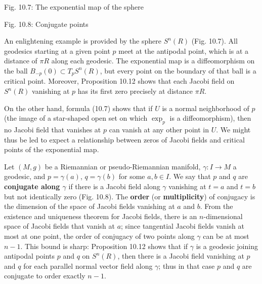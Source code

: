 
Fig. 10.7: The exponential map of the sphere


Fig. 10.8: Conjugate points

An enlightening example is provided by the sphere $S^n(R)$ (Fig. 10.7). All geodesics starting at a given point $p$ meet at the antipodal point, which is at a distance of $\pi R$ along each geodesic. The exponential map is a diffeomorphism on the ball $B_{-p}(0) \subset T_p S^n(R)$, but every point on the boundary of that ball is a critical point. Moreover, Proposition 10.12 shows that each Jacobi field on $S^n(R)$ vanishing at $p$ has its first zero precisely at distance $\pi R$.

On the other hand, formula (10.7) shows that if $U$ is a normal neighborhood of $p$ (the image of a star-shaped open set on which $\exp_p$ is a diffeomorphism), then no Jacobi field that vanishes at $p$ can vanish at any other point in $U$. We might thus be led to expect a relationship between zeros of Jacobi fields and critical points of the exponential map.

Let $(M, g)$ be a Riemannian or pseudo-Riemannian manifold, $\gamma: I \to M$ a geodesic, and $p = \gamma(a)$, $q = \gamma(b)$ for some $a, b \in I$. We say that $p$ and $q$ are \textbf{conjugate along $\gamma$} if there is a Jacobi field along $\gamma$ vanishing at $t = a$ and $t = b$ but not identically zero (Fig. 10.8). The \textbf{order} (or \textbf{multiplicity}) of conjugacy is the dimension of the space of Jacobi fields vanishing at $a$ and $b$. From the existence and uniqueness theorem for Jacobi fields, there is an $n$-dimensional space of Jacobi fields that vanish at $a$; since tangential Jacobi fields vanish at most at one point, the order of conjugacy of two points along $\gamma$ can be at most $n - 1$. This bound is sharp: Proposition 10.12 shows that if $\gamma$ is a geodesic joining antipodal points $p$ and $q$ on $S^n(R)$, then there is a Jacobi field vanishing at $p$ and $q$ for each parallel normal vector field along $\gamma$; thus in that case $p$ and $q$ are conjugate to order exactly $n - 1$.

